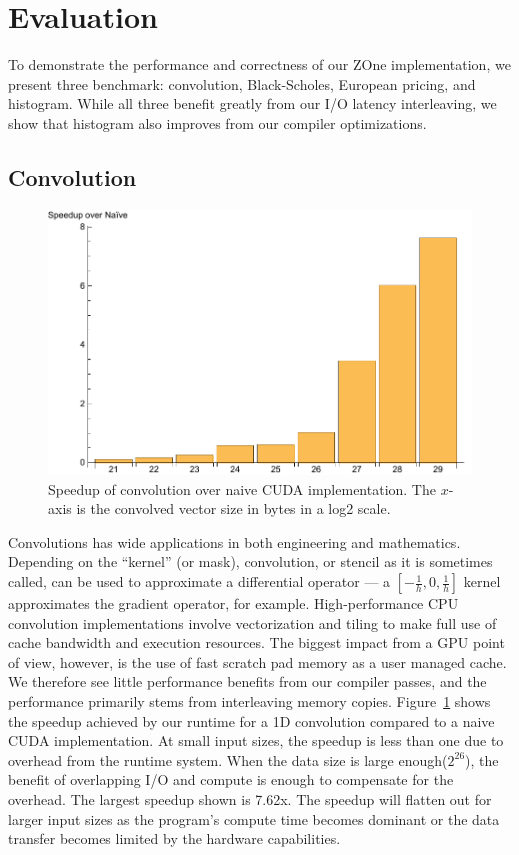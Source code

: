 \section{Evaluation}

To demonstrate the performance and correctness of our ZOne implementation, we
present three benchmark: convolution, Black-Scholes, European pricing, and histogram.
While all three benefit greatly from our I/O latency interleaving, we show
  that histogram also improves from our compiler optimizations.


\subsection{Convolution}

\begin{figure}
\centering
\includegraphics[scale=0.5]{data/stencil.pdf}
\caption{Speedup of convolution over naive CUDA implementation.
  The $x$-axis is the convolved vector size in bytes in a log2 scale.}
\label{fig:stencil}
\centering
\end{figure}

Convolutions has wide applications in both engineering and mathematics.
Depending on the ``kernel'' (or mask), convolution, or stencil as it is sometimes called,   can be used to approximate a differential operator ---
 a $[-\frac{1}{h}, 0, \frac{1}{h}]$ kernel approximates the gradient operator, for example.
High-performance CPU convolution implementations
involve vectorization and tiling to make full use of cache bandwidth and
execution resources.
The biggest impact from a GPU point of view, however, is the use of fast
  scratch pad memory as a user managed cache.
We therefore see little performance benefits from our compiler passes, and the
  performance primarily stems from interleaving memory copies.
Figure~\ref{fig:stencil} shows the speedup achieved by our runtime for a 1D
  convolution compared to a naive CUDA implementation.
At small input sizes, the speedup is less than one due to overhead from the
runtime system. When the data size is large enough($2^{26}$), the benefit of
overlapping I/O and compute is enough to compensate for the overhead. The
largest speedup shown is 7.62x. The speedup will flatten out for larger
input sizes as the program's compute time becomes dominant or the data transfer
becomes limited by the hardware capabilities.


